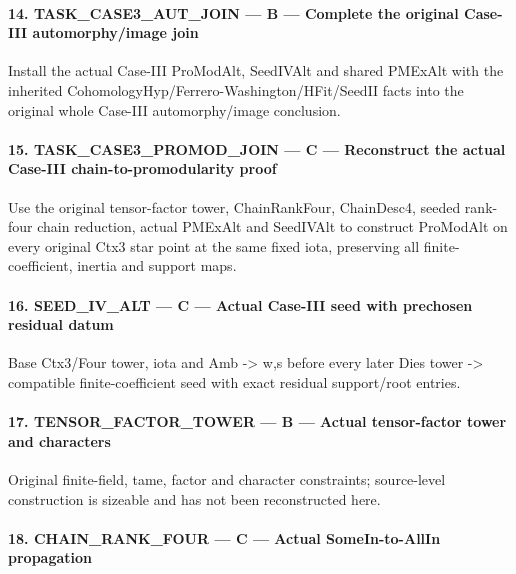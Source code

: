 \paragraph{14. TASK\_\allowbreak{}CASE3\_\allowbreak{}AUT\_\allowbreak{}JOIN — B — Complete the original Case-III automorphy/\allowbreak{}image join}

Install the actual Case-III ProModAlt, SeedIVAlt and shared PMExAlt with the inherited CohomologyHyp/\allowbreak{}Ferrero-Washington/\allowbreak{}HFit/\allowbreak{}SeedII facts into the original whole Case-III automorphy/\allowbreak{}image conclusion.

\paragraph{15. TASK\_\allowbreak{}CASE3\_\allowbreak{}PROMOD\_\allowbreak{}JOIN — C — Reconstruct the actual Case-III chain-to-promodularity proof}

Use the original tensor-factor tower, ChainRankFour, ChainDesc4, seeded rank-four chain reduction, actual PMExAlt and SeedIVAlt to construct ProModAlt on every original Ctx3 star point at the same fixed iota, preserving all finite-coefficient, inertia and support maps.

\paragraph{16. SEED\_\allowbreak{}IV\_\allowbreak{}ALT — C — Actual Case-III seed with prechosen residual datum}

Base Ctx3/\allowbreak{}Four tower, iota and Amb -> w,s before every later Dies tower -> compatible finite-coefficient seed with exact residual support/\allowbreak{}root entries.

\paragraph{17. TENSOR\_\allowbreak{}FACTOR\_\allowbreak{}TOWER — B — Actual tensor-factor tower and characters}

Original finite-field, tame, factor and character constraints; source-level construction is sizeable and has not been reconstructed here.

\paragraph{18. CHAIN\_\allowbreak{}RANK\_\allowbreak{}FOUR — C — Actual SomeIn-to-AllIn propagation}

